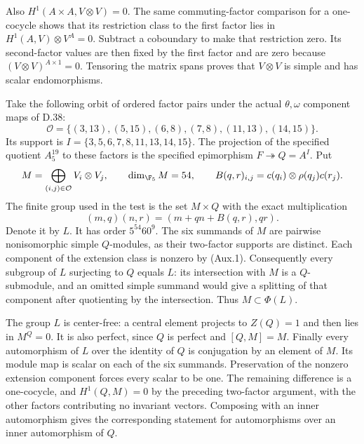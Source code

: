Also $H^1(A\times A,V\otimes V)=0$.  The same commuting-factor
comparison for a one-cocycle shows that its restriction class to
the first factor lies in
$H^1(A,V)\otimes V^A=0$.  Subtract a coboundary to make that
restriction zero.  Its second-factor values are then fixed by the
first factor and are zero because $(V\otimes V)^{A\times1}=0$.
Tensoring the matrix spans proves that $V\otimes V$ is simple and
has scalar endomorphisms.

Take the following orbit of ordered factor pairs under the actual
$\theta,\omega$ component maps of D.38:
\[
 \mathcal O=\{(3,13),(5,15),(6,8),(7,8),(11,13),(14,15)\}.
\]
Its support is
$I=\{3,5,6,7,8,11,13,14,15\}$.  The projection of the specified
quotient $A_5^{19}$ to these factors is the specified epimorphism
$F\twoheadrightarrow Q=A^I$.  Put
\[
 M=\bigoplus_{(i,j)\in\mathcal O} V_i\otimes V_j,
 \qquad \dim_{\F_5}M=54,
 \qquad
 B(q,r)_{i,j}=c(q_i)\otimes\rho(q_j)c(r_j).
\]
The finite group used in the test is the set $M\times Q$ with
the exact multiplication
\[
 (m,q)(n,r)=(m+q n+B(q,r),qr).                            \tag{Aux.2}
\]
Denote it by $L$.  It has order $5^{54}60^9$.
The six summands of $M$ are pairwise nonisomorphic simple
$Q$-modules, as their two-factor supports are distinct.  Each
component of the extension class is nonzero by (Aux.1).
Consequently every subgroup of $L$ surjecting to $Q$ equals $L$:
its intersection with $M$ is a $Q$-submodule, and an omitted
simple summand would give a splitting of that component after
quotienting by the intersection.  Thus $M\subset\Phi(L)$.

The group $L$ is center-free: a central element projects to
$Z(Q)=1$ and then lies in $M^Q=0$.  It is also perfect, since
$Q$ is perfect and $[Q,M]=M$.  Finally every automorphism of $L$
over the identity of $Q$ is conjugation by an element of $M$.
Its module map is scalar on each of the six summands.  Preservation
of the nonzero extension component forces every scalar to be one.
The remaining difference is a one-cocycle, and
$H^1(Q,M)=0$ by the preceding two-factor argument, with the
other factors contributing no invariant vectors.  Composing with
an inner automorphism gives the corresponding statement for
automorphisms over an inner automorphism of $Q$.

